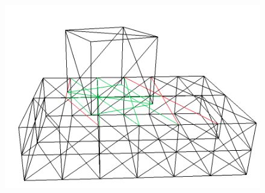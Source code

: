 \begin{figure}[tbp]
\begin{minipage}[b]{0.3 \linewidth}
{       \includegraphics[width=1.0\linewidth]{pics/png/redef_ee03.png} }
	\end{minipage}\\
	

\end{figure}
